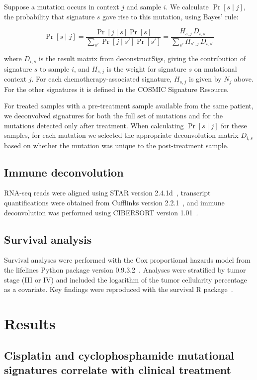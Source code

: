 \documentclass[linenumbers]{bmcart}
\begin{document}
Suppose a mutation occurs in context $j$ and sample $i$. We calculate $\Pr[s \mid j]$, the probability that signature $s$ gave rise to this mutation, using Bayes' rule:

\[
\Pr[s \mid j] = \frac{\Pr[j \mid s] \Pr[s]}{\sum_{s'}{\Pr[j \mid s']\Pr[s']}} = \frac{H_{s,j} \, D_{i,s}}{\sum_{s'}{H_{s',j} \, D_{i,s'}}}
\]

where $D_{i,s}$ is the result matrix from deconstructSigs, giving the contribution of signature $s$ to sample $i$, and $H_{s,j}$ is the weight for signature $s$ on mutational context $j$. For each chemotherapy-associated signature, $H_{s,j}$ is given by $N_j$ above. For the other signatures it is defined in the COSMIC Signature Resource.

For treated samples with a pre-treatment sample available from the same patient, we deconvolved signatures for both the full set of mutations and for the mutations detected only after treatment. When calculating $\Pr[s \mid j]$ for these samples, for each mutation we selected the appropriate deconvolution matrix $D_{i,s}$ based on whether the mutation was unique to the post-treatment sample.

\subsection*{Immune deconvolution}
RNA-seq reads were aligned using STAR version 2.4.1d~\cite{dobin2013}, transcript quantifications were obtained from Cufflinks version 2.2.1~\cite{trapnell2010}, and immune deconvolution was performed using CIBERSORT version 1.01~\cite{newman2015}. 

\subsection*{Survival analysis}
Survival analyses were performed with the Cox proportional hazards model from the lifelines Python package version 0.9.3.2~\cite{cameron2017}. Analyses were stratified by tumor stage (III or IV) and included the logarithm of the tumor cellularity percentage as a covariate. Key findings were reproduced with the survival R package~\cite{survivalpackage}.

\section*{Results}

\subsection*{Cisplatin and cyclophosphamide mutational signatures correlate with clinical treatment}
\end{document}
